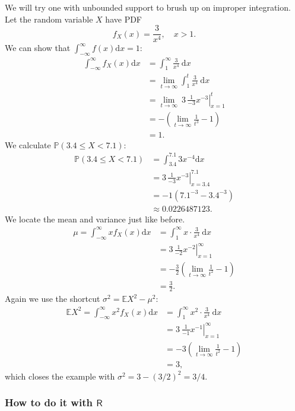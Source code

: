\documentclass[captions=tableheading]{scrbook}
\begin{document}
\begin{example}

We will try one with unbounded support to brush up on improper integration. Let the random variable \(X\) have PDF
\[
f_{X}(x)=\frac{3}{x^{4}},\quad x>1.
\]
We can show that \(\int_{-\infty}^{\infty}f(x)\mathrm{d} x=1\):
\begin{align*}
\int_{-\infty}^{\infty}f_{X}(x)\mathrm{d} x & =\int_{1}^{\infty}\frac{3}{x^{4}}\:\mathrm{d} x\\
 & =\lim_{t\to\infty}\int_{1}^{t}\frac{3}{x^{4}}\:\mathrm{d} x\\
 & =\lim_{t\to\infty}\ \left.3\,\frac{1}{-3}x^{-3}\right|_{x=1}^{t}\\
 & =-\left(\lim_{t\to\infty}\frac{1}{t^{3}}-1\right)\\
 & =1.
\end{align*}
We calculate \(\mathbb{P}(3.4\leq X<7.1)\):
\begin{align*}
\mathbb{P}(3.4\leq X<7.1) & =\int_{3.4}^{7.1}3x^{-4}\mathrm{d} x\\
 & =\left.3\,\frac{1}{-3}x^{-3}\right|_{x=3.4}^{7.1}\\
 & =-1(7.1^{-3}-3.4^{-3})\\
 & \approx0.0226487123.
\end{align*}
We locate the mean and variance just like before.
\begin{align*}
\mu=\int_{-\infty}^{\infty}xf_{X}(x)\mathrm{d} x & =\int_{1}^{\infty}x\cdot\frac{3}{x^{4}}\:\mathrm{d} x\\
 & =\left.3\,\frac{1}{-2}x^{-2}\right|_{x=1}^{\infty}\\
 & =-\frac{3}{2}\left(\lim_{t\to\infty}\frac{1}{t^{2}}-1\right)\\
 & =\frac{3}{2}.
\end{align*}
Again we use the shortcut \(\sigma^{2}=\mathbb{E} X^{2}-\mu^{2}\):
\begin{align*}
\mathbb{E} X^{2}=\int_{-\infty}^{\infty}x^{2}f_{X}(x)\mathrm{d} x & =\int_{1}^{\infty}x^{2}\cdot\frac{3}{x^{4}}\:\mathrm{d} x\\
 & =\left.3\:\frac{1}{-1}x^{-1}\right|_{x=1}^{\infty}\\
 & =-3\left(\lim_{t\to\infty}\frac{1}{t^{2}}-1\right)\\
 & =3,
\end{align*}
which closes the example with \(\sigma^{2}=3-(3/2)^{2}=3/4\).
\end{example}
\subsubsection{How to do it with \(\mathsf{R}\)}
\label{sec-6-1-2-1}
\end{document}
